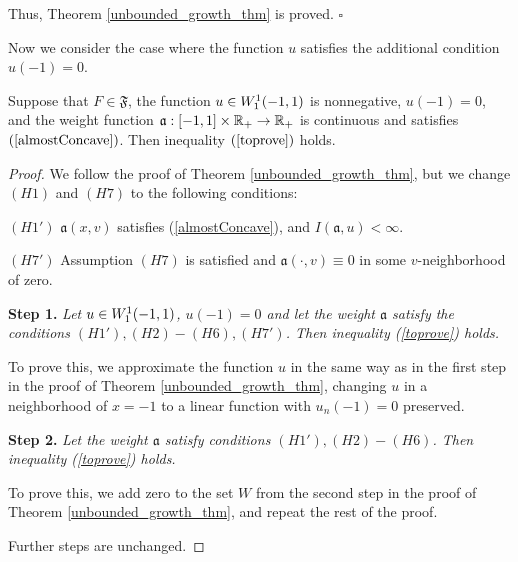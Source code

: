 Thus, Theorem \ref{unbounded_growth_thm} is proved.
\hfill $\square$

\medskip

Now we consider the case where the function $u$ satisfies the additional condition $u(-1) = 0$.
\begin{thm}
Suppose that $F \in \mathfrak{F}$, the function $u \in W_1^1(-1, 1)$ is nonnegative, $u(-1) = 0$,
and the weight function $\mathfrak a: [-1, 1] \times \mathbb R_+ \to \mathbb R_+$ is continuous
and satisfies $(\ref{almostConcave})$.
Then inequality $(\ref{toprove})$ holds.
\end{thm}

\begin{proof}
We follow the proof of Theorem \ref{unbounded_growth_thm},
but we change $(H1)$ and $(H7)$ to the following conditions:

\bigskip
\noindent
$(H1')$ $\mathfrak a(x, v)$ satisfies (\ref{almostConcave}), and $I(\mathfrak a, u) < \infty$.

\bigskip
\noindent
$(H7')$ Assumption $(H7)$ is satisfied and $\mathfrak a(\cdot, v) \equiv 0$ in some $v$-neighborhood of zero.

\bigskip
\textbf{Step 1.} \textit{Let $u \in W_1^1(-1, 1)$, $u(-1) = 0$ and let the weight $\mathfrak a$ satisfy the conditions $(H1'), (H2)-(H6), (H7')$.
Then inequality (\ref{toprove}) holds.}

To prove this, we approximate the function $u$ in the same way as in the first step in the proof of Theorem \ref{unbounded_growth_thm},
changing $u$ in a neighborhood of $x = -1$ to a linear function with $u_n(-1) = 0$ preserved.

\bigskip
\textbf{Step 2.} \textit{Let the weight $\mathfrak a$ satisfy conditions $(H1'), (H2)-(H6)$.
Then inequality (\ref{toprove}) holds.}

To prove this, we add zero to the set $W$ from the second step in the proof of Theorem \ref{unbounded_growth_thm},
and repeat the rest of the proof.

\medskip

Further steps are unchanged.
\end{proof}

